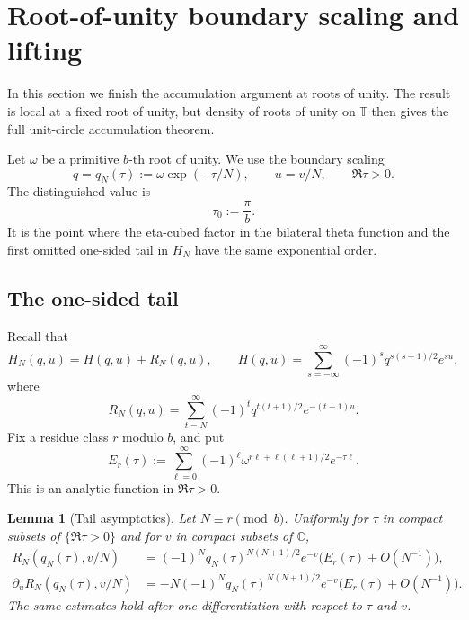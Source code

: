 \documentclass[11pt,a4paper,reqno]{amsart}
\newtheorem{lemma}[theorem]{Lemma}
\theoremstyle{remark}
\newcommand{\C}{\mathbb C}
\newcommand{\T}{\mathbb T}
\begin{document}
\section{Root-of-unity boundary scaling and lifting}
In this section we finish the accumulation argument at roots of unity.  The result is local at a fixed root of unity, but density of roots of unity on $\T$ then gives the full unit-circle accumulation theorem.

Let $\omega$ be a primitive $b$-th root of unity.  We use the boundary scaling
\begin{equation}\label{eq:root-unity-scaling-final}
        q=q_N(\tau):=\omega\exp(-\tau/N),
        \qquad
        u=v/N,
        \qquad
        \Re\tau>0.
\end{equation}
The distinguished value is
\begin{equation}\label{eq:tau0-def}
        \tau_0:=\frac{\pi}{b}.
\end{equation}
It is the point where the eta-cubed factor in the bilateral theta function and the first omitted one-sided tail in $H_N$ have the same exponential order.

\subsection{The one-sided tail}
Recall that
\[
        H_N(q,u)=H(q,u)+R_N(q,u),
        \qquad
        H(q,u)=\sum_{s=-\infty}^{\infty}(-1)^sq^{s(s+1)/2}e^{su},
\]
where
\begin{equation}\label{eq:tail-final-def}
        R_N(q,u)=\sum_{t=N}^{\infty}(-1)^tq^{t(t+1)/2}e^{-(t+1)u}.
\end{equation}
Fix a residue class $r$ modulo $b$, and put
\begin{equation}\label{eq:Er-def}
        E_r(\tau):=
        \sum_{\ell=0}^{\infty}(-1)^\ell
        \omega^{r\ell+\ell(\ell+1)/2}e^{-\tau\ell}.
\end{equation}
This is an analytic function in $\Re\tau>0$.

\begin{lemma}[Tail asymptotics]\label{lem:tail-asymptotics-final}
Let $N\equiv r\pmod b$.  Uniformly for $\tau$ in compact subsets of $\{\Re\tau>0\}$ and for $v$ in compact subsets of $\C$,
\begin{align}
        R_N(q_N(\tau),v/N)
        &=(-1)^Nq_N(\tau)^{N(N+1)/2}e^{-v}
          \big(E_r(\tau)+O(N^{-1})\big),\label{eq:tail-asym-final}\\
        \partial_uR_N(q_N(\tau),v/N)
        &=-N(-1)^Nq_N(\tau)^{N(N+1)/2}e^{-v}
          \big(E_r(\tau)+O(N^{-1})\big).\label{eq:tail-der-asym-final}
\end{align}
The same estimates hold after one differentiation with respect to $\tau$ and $v$.
\end{lemma}
\end{document}

